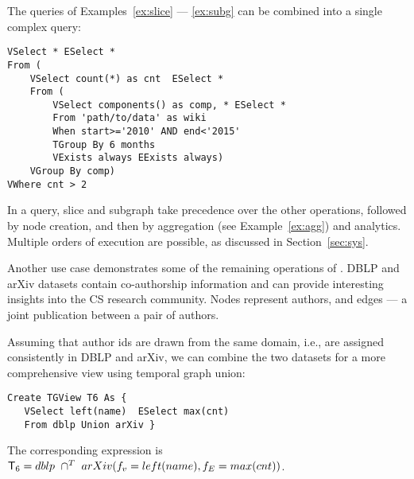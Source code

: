 The queries of Examples~\ref{ex:slice} --- \ref{ex:subg} can be
combined into a single complex query:

\begin{small}
\begin{verbatim}
VSelect * ESelect *
From (
    VSelect count(*) as cnt  ESelect *
    From (
        VSelect components() as comp, * ESelect *
        From 'path/to/data' as wiki
        When start>='2010' AND end<'2015' 
        TGroup By 6 months
        VExists always EExists always)
    VGroup By comp)
VWhere cnt > 2 
\end{verbatim}
\end{small}

In a \ql query, slice and subgraph take precedence over the other
operations, followed by node creation, and then by aggregation (see
Example~\ref{ex:agg}) and analytics.  Multiple orders of execution are
possible, as discussed in Section~\ref{sec:sys}.


Another use case demonstrates some of the remaining operations of
\tga.  DBLP and arXiv datasets contain co-authorship information and
can provide interesting insights into the CS research community.
Nodes represent authors, and edges --- a joint publication between a
pair of authors.

\begin{example}
\label{ex:union}

Assuming that author ids are drawn from the same domain, i.e., are
assigned consistently in DBLP and arXiv, we can combine the two
datasets for a more comprehensive view using temporal graph union:

\begin{small}
\begin{verbatim}
Create TGView T6 As {
   VSelect left(name)  ESelect max(cnt)
   From dblp Union arXiv }
\end{verbatim}
\end{small}

The corresponding \tga expression is\\$\mathsf{T}_6 = dblp~\cap^T~arXiv(f_v=left(name),f_E=max(cnt))$.
\end{example}

